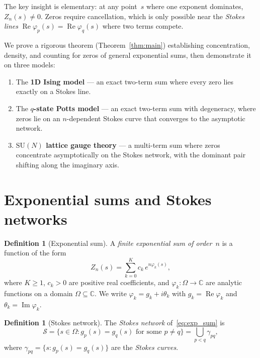 \documentclass[12pt]{article}
\theoremstyle{definition}
\newtheorem{definition}[theorem]{Definition}
\theoremstyle{remark}
\newcommand{\SU}{\mathrm{SU}}
\newcommand{\re}{\operatorname{Re}}
\newcommand{\im}{\operatorname{Im}}
\begin{document}
The key insight is elementary: at any point~$s$ where one exponent
dominates, $Z_n(s) \neq 0$.  Zeros require cancellation, which is
only possible near the \emph{Stokes lines}
$\re\varphi_p(s) = \re\varphi_q(s)$ where two terms compete.

We prove a rigorous theorem (Theorem~\ref{thm:main}) establishing
concentration, density, and counting for zeros of general exponential
sums, then demonstrate it on three models:
\begin{enumerate}
\item The \textbf{1D Ising model} --- an exact two-term sum where
  every zero lies exactly on a Stokes line.

\item The \textbf{$q$-state Potts model} --- an exact two-term sum
  with degeneracy, where zeros lie on an $n$-dependent Stokes curve
  that converges to the asymptotic network.

\item \textbf{$\SU(N)$ lattice gauge theory} --- a multi-term sum
  where zeros concentrate asymptotically on the Stokes network, with
  the dominant pair shifting along the imaginary axis.
\end{enumerate}


\section{Exponential sums and Stokes networks}
\label{sec:setup}

\begin{definition}[Exponential sum]\label{def:exp_sum}
A \emph{finite exponential sum of order~$n$} is a function of the form
\begin{equation}\label{eq:exp_sum}
Z_n(s) = \sum_{k=0}^{K} c_k\, e^{n\varphi_k(s)},
\end{equation}
where $K \geq 1$, $c_k > 0$ are positive real coefficients, and
$\varphi_k : \Omega \to \mathbb{C}$ are analytic functions on a
domain $\Omega \subseteq \mathbb{C}$.  We write
$\varphi_k = g_k + i\theta_k$ with $g_k = \re\varphi_k$ and
$\theta_k = \im\varphi_k$.
\end{definition}

\begin{definition}[Stokes network]\label{def:stokes}
The \emph{Stokes network} of~\eqref{eq:exp_sum} is
\[
\mathcal{S} = \bigl\{s \in \Omega : g_p(s) = g_q(s)
\text{ for some } p \neq q\bigr\}
= \bigcup_{p < q} \gamma_{pq},
\]
where $\gamma_{pq} = \{s : g_p(s) = g_q(s)\}$ are the
\emph{Stokes curves}.
\end{definition}
\end{document}
